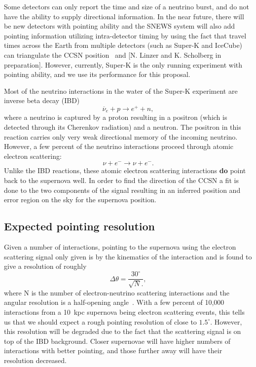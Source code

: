 \documentclass[12pt, letterpaper]{article}
\newcommand{\superk}  {Super\nobreakdash-K\xspace}
\begin{document}
Some detectors can only report the time and size of a neutrino burst,
and do not have the ability to supply directional information.  In the
near future, there will be new detectors with pointing ability and the
SNEWS system will also add pointing information utilizing
intra-detector timing by using the fact that travel times across the
Earth from multiple detectors (such as \superk and IceCube) can
triangulate the CCSN position~\cite{2018JCAP...04..025B} and
[N. Linzer and K. Scholberg in preparation].  However, currently,
\superk is the only running experiment with pointing ability, and we
use its performance for this proposal.

Most of the neutrino interactions in the water of the \superk
experiment are inverse beta decay (IBD)
%
$$ \overline{\nu}_{e}+ p \rightarrow e^{+} + n , $$
%
where a neutrino is
captured by a proton resulting in a positron (which is detected
through its Cherenkov radiation) and a neutron.  The positron in this
reaction carries only very weak directional memory of the incoming
neutrino. However, a few percent of the neutrino interactions proceed
through atomic electron scattering:
%
$$\nu + e^{-} \rightarrow \nu + e^{-} .$$
%
Unlike the IBD reactions,
these atomic electron scattering interactions {\bf do} point back to
the supernova well.  In order to find the direction of the CCSN a fit
is done to the two components of the signal resulting in an inferred
position and error region on the sky for the supernova position.

\subsection{Expected pointing resolution}

Given a number of interactions, pointing to the supernova using the
electron scattering signal only given is by the kinematics of the
interaction and is found to give a resolution of roughly
%
$$ \Delta \theta = \frac{30^\circ}{\sqrt{N}.}, $$
%
where N is the number of electron-neutrino scattering interactions and
the angular resolution is a half-opening
angle~\cite{2012ARNPS..62...81S}.  With a few percent of 10,000
interactions from a 10~kpc supernova being electron scattering events,
this tells us that we should expect a rough pointing resolution of
close to $1.5^\circ$.   However, this resolution will be degraded
due to the fact that the scattering signal is on top of the IBD
background. Closer supernovae will have higher numbers of
interactions with better pointing, and those further away will have
their resolution decreased.
\end{document}
